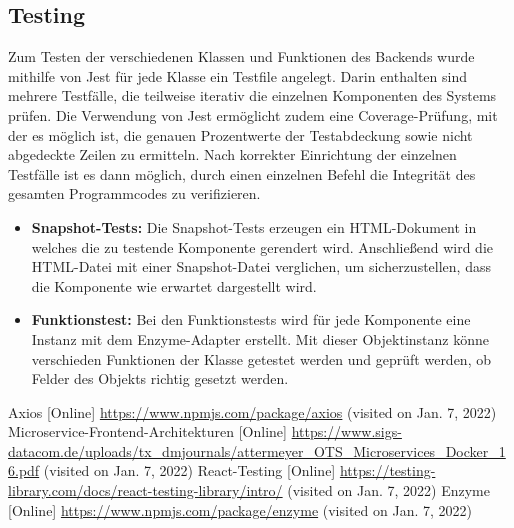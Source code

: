 \documentclass[conference]{IEEEtran}
\begin{document}
\subsection{Testing}
Zum Testen der verschiedenen Klassen und Funktionen des Backends wurde mithilfe von Jest für jede Klasse ein Testfile angelegt. Darin enthalten sind mehrere Testfälle, die teilweise iterativ die einzelnen Komponenten des Systems prüfen. Die Verwendung von Jest ermöglicht zudem eine Coverage-Prüfung, mit der es möglich ist, die genauen Prozentwerte der Testabdeckung sowie nicht abgedeckte Zeilen zu ermitteln. Nach korrekter Einrichtung der einzelnen Testfälle ist es dann möglich, durch einen einzelnen Befehl die Integrität des gesamten Programmcodes zu verifizieren.

\begin{itemize}
    \item \textbf{Snapshot-Tests:}
    Die Snapshot-Tests erzeugen ein HTML-Dokument in welches die zu testende Komponente gerendert wird.
    Anschließend wird die HTML-Datei mit einer Snapshot-Datei verglichen, um sicherzustellen, dass die Komponente wie erwartet dargestellt wird.
    \item \textbf{Funktionstest:}
    Bei den Funktionstests wird für jede Komponente eine Instanz mit dem Enzyme-Adapter erstellt.
    Mit dieser Objektinstanz könne verschieden Funktionen der Klasse getestet werden und geprüft werden, ob Felder des Objekts richtig gesetzt werden.
\end{itemize}



\begin{thebibliography}{0}
	Axios [Online] \url{https://www.npmjs.com/package/axios} (visited on Jan. 7, 2022)
    Microservice-Frontend-Architekturen [Online] \url{https://www.sigs-datacom.de/uploads/tx_dmjournals/attermeyer_OTS_Microservices_Docker_16.pdf} (visited on Jan. 7, 2022)
    React-Testing [Online] \url{https://testing-library.com/docs/react-testing-library/intro/} (visited on Jan. 7, 2022)
    Enzyme [Online] \url{https://www.npmjs.com/package/enzyme} (visited on Jan. 7, 2022)  
\end{thebibliography}
\end{document}

